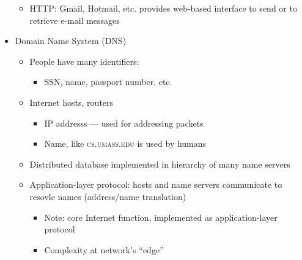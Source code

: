 \begin{itemize}
\begin{itemize}
\begin{itemize}
        \end{itemize}

      \item HTTP: Gmail, Hotmail, etc. provides web-based interface to send or to retrieve e-mail messages

    \end{itemize}

  \item Domain Name System (DNS)

    \begin{itemize}

      \item People have many identifiers:

        \begin{itemize}

          \item SSN, name, passport number, etc.

        \end{itemize}

      \item Internet hosts, routers

        \begin{itemize}

          \item IP addresss — used for addressing packets

          \item Name, like \textsc{cs.umass.edu} is used by humans

        \end{itemize}

      \item Distributed database implemented in hierarchy of many name servers

      \item Application-layer protocol: hosts and name servers communicate to resovle names (address/name translation)

        \begin{itemize}

          \item Note: core Internet function, implemented as application-layer protocol

          \item Complexity at network's ``edge''

        \end{itemize}

    \end{itemize}

\end{itemize}



